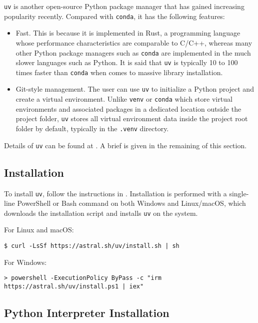 \texttt{uv} is another open-source Python package manager that has gained increasing popularity recently. Compared with \verb|conda|, it has the following features:
\begin{itemize}
	\item Fast. This is because it is implemented in Rust, a programming language whose performance characteristics are comparable to C/C++, whereas many other Python package managers such as \verb|conda| are implemented in the much slower languages such as Python. It is said that \verb|uv| is typically 10 to 100 times faster than \verb|conda| when comes to massive library installation.
	
	\item Git-style management. The user can use \verb|uv| to initialize a Python project and create a virtual environment. Unlike \verb|venv| or \verb|conda| which store virtual environments and associated packages in a dedicated location outside the project folder, \verb|uv| stores all virtual environment data inside the project root folder by default, typically in the \verb|.venv| directory.
\end{itemize}

Details of \verb|uv| can be found at \cite{astral2025uv}. A brief is given in the remaining of this section.

\subsection{Installation}

To install \verb|uv|, follow the instructions in \cite{astral2025uv}. Installation is performed with a single-line PowerShell or Bash command on both Windows and Linux/macOS, which downloads the installation script and installs \verb|uv| on the system.

For Linux and macOS:
\begin{lstlisting}
$ curl -LsSf https://astral.sh/uv/install.sh | sh
\end{lstlisting}

For Windows:
\begin{lstlisting}
> powershell -ExecutionPolicy ByPass -c "irm https://astral.sh/uv/install.ps1 | iex"
\end{lstlisting}

\subsection{Python Interpreter Installation}


